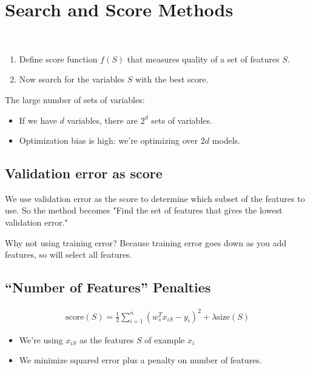 \section{Search and Score Methods} \label{sec:}

\begin{idea} ~
    \begin{enumerate}
        \item Define score function $f(S)$ that measures quality of a set of features $S$.
        \item Now search for the variables $S$ with the best score.
    \end{enumerate}
\end{idea}

\begin{problem}
    The large number of sets of variables:
    \begin{itemize}
        \item If we have $d$ variables, there are $2^{d}$ sets of variables.
        \item Optimization bias is high: we’re optimizing over $2d$ models.
    \end{itemize}
\end{problem}

\subsection{Validation error as score} \label{sec:}

We use validation error as the score to determine which subset of the features to use. So the method becomes "Find the set of features that gives the lowest validation error."

Why not using training error? Because training error goes down as you add features, so will select all features.

\subsection{“Number of Features” Penalties} \label{sec:}

\begin{align*}
    \text{score}(S) = \frac{1}{2} \sum\limits_{i=1}^{n} (w_s^{T}x_{iS} - y_i)^{2} + \lambda \text{size}(S)
\end{align*}

\begin{note}
    \begin{itemize}
        \item We’re using $x_{iS}$ as the features $S$ of example $x_i$
        \item We minimize squared error plus a penalty on number of features.
    \end{itemize}
\end{note}

